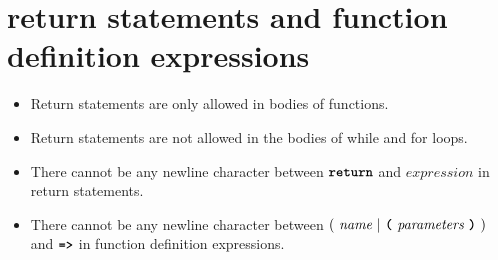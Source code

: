 \section*{\textrm{return} statements and function definition expressions}

\begin{itemize}
\item Return statements are only allowed in bodies of functions.
\item Return statements are not allowed in the bodies of while and for loops.
\item There cannot be any newline character between
$\textbf{\texttt{return}}$ and $\textit{expression}$ in return statements.
\item There cannot be any newline character between
  $(\ \textit{name}\ | \ \textbf{\texttt{(}}\ \textit{parameters}\ \textbf{\texttt{)}}\ )$
                                               and
$\texttt{\textbf{=>}}$ in function definition expressions.
                                               
\end{itemize}
